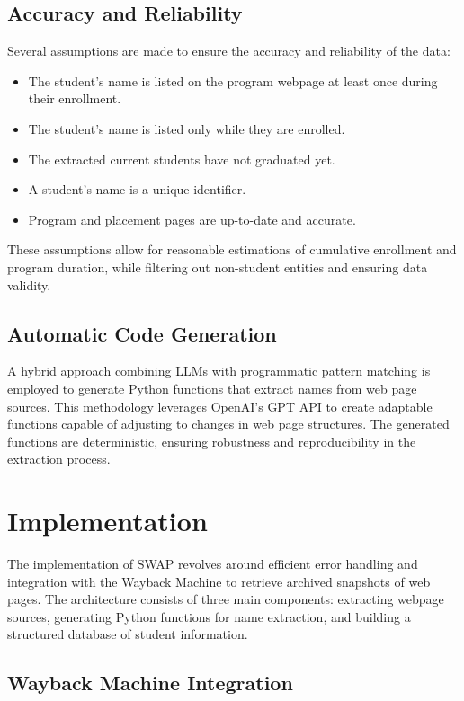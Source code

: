 \documentclass[11pt]{article}
\begin{document}
\subsection{Accuracy and Reliability}

Several assumptions are made to ensure the accuracy and reliability of the data:
\begin{itemize}
    \item The student's name is listed on the program webpage at least once during their enrollment.
    \item The student's name is listed only while they are enrolled.
    \item The extracted current students have not graduated yet.
    \item A student's name is a unique identifier.
    \item Program and placement pages are up-to-date and accurate.
\end{itemize}

These assumptions allow for reasonable estimations of cumulative enrollment and program duration, while filtering out non-student entities and ensuring data validity.

\subsection{Automatic Code Generation}

A hybrid approach combining LLMs with programmatic pattern matching is employed to generate Python functions that extract names from web page sources. This methodology leverages OpenAI's GPT API to create adaptable functions capable of adjusting to changes in web page structures. The generated functions are deterministic, ensuring robustness and reproducibility in the extraction process.

\section{Implementation}

The implementation of SWAP revolves around efficient error handling and integration with the Wayback Machine to retrieve archived snapshots of web pages. The architecture consists of three main components: extracting webpage sources, generating Python functions for name extraction, and building a structured database of student information.

\subsection{Wayback Machine Integration}
\end{document}
